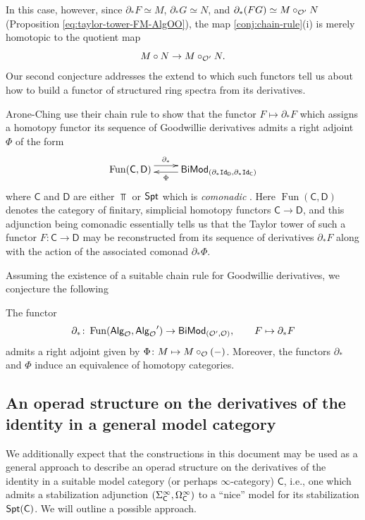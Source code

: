 In this case, however, since $\partial_*F\simeq M$, $\partial_*G\simeq N$, and $\partial_*(FG)\simeq M\circ_{\mathcal{O}'}N$ (Proposition \ref{eq:taylor-tower-FM-AlgOO}), the map \ref{conj:chain-rule}(i) is merely homotopic to the quotient map \[ M\circ N\to M \circ_{\mathcal{O}'} N.\] Our second conjecture addresses the extend to which such functors tell us about how to build a functor of structured ring spectra from its derivatives. 

Arone-Ching \cite{AC-coalg} use their chain rule to show that the functor $F\mapsto \partial_*F$ which assigns a homotopy functor its sequence of Goodwillie derivatives admits a right adjoint $\Phi$ of the form
\begin{equation} \label{eq:deriv-coalg} \xymatrix{ \operatorname{Fun} (\mathsf{C},\mathsf{D}) \ar@<1ex>[r]^-{\partial_*} & \mathsf{BiMod}_{(\partial_* \Id_{\mathsf{D}},\partial_*\Id_{\mathsf{C}})} \ar@<.5ex>[l]^-{\Phi} }\end{equation}
where $\mathsf{C}$ and $\mathsf{D}$ are either $\Top$ or $\mathsf{Spt}$ which is \textit{comonadic} \cite{Hess}. Here $\operatorname{Fun}(\mathsf{C},\mathsf{D})$ denotes the category of finitary, simplicial homotopy functors $\mathsf{C}\to\mathsf{D}$, and this adjunction being comonadic essentially tells us that the Taylor tower of such a functor $F\colon \mathsf{C}\to\mathsf{D}$ may be reconstructed from its sequence of derivatives $\partial_*F$ along with the action of the associated comonad $\partial_* \Phi$. 

Assuming the existence of a suitable chain rule for Goodwillie derivatives, we conjecture the following 

\begin{conjecture}
The functor  \[ \partial_* \colon \operatorname{Fun} ({\mathsf{Alg}_{\mathcal{O}}},{\mathsf{Alg}_{\mathcal{O}}}')\to  \mathsf{BiMod}_{(\mathcal{O}',\mathcal{O})}, \quad \quad F\mapsto \partial_*F \] admits a right adjoint given by $\Phi\colon M\mapsto M\circ_{\mathcal{O}}(-)$. Moreover, the functors $\partial_*$ and $\Phi$ induce an equivalence of homotopy categories. 
\end{conjecture}


\subsection{An operad structure on the derivatives of the identity in a general model category} We additionally expect that the constructions in this document may be used as a general approach to describe an operad structure on the derivatives of the identity in a suitable model category (or perhaps $\infty$-category) $\mathsf{C}$, i.e., one which admits a stabilization adjunction $(\Sigma^{\infty}_{\mathsf{C}},\Omega^{\infty}_{\mathsf{C}})$ to a ``nice'' model for its stabilization $\mathsf{Spt}(\mathsf{C})$. We will outline a possible approach.

